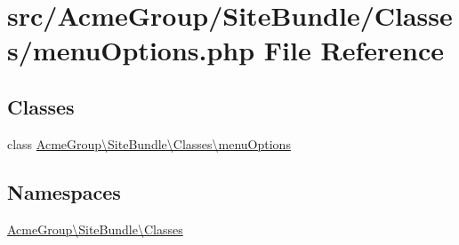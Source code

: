 \hypertarget{menu_options_8php}{\section{src/\+Acme\+Group/\+Site\+Bundle/\+Classes/menu\+Options.php File Reference}
\label{menu_options_8php}
}
\subsection*{Classes}
\begin{DoxyCompactItemize}
\item 
class \hyperlink{class_acme_group_1_1_site_bundle_1_1_classes_1_1menu_options}{Acme\+Group\textbackslash{}\+Site\+Bundle\textbackslash{}\+Classes\textbackslash{}menu\+Options}
\end{DoxyCompactItemize}
\subsection*{Namespaces}
\begin{DoxyCompactItemize}
\item 
 \hyperlink{namespace_acme_group_1_1_site_bundle_1_1_classes}{Acme\+Group\textbackslash{}\+Site\+Bundle\textbackslash{}\+Classes}
\end{DoxyCompactItemize}
